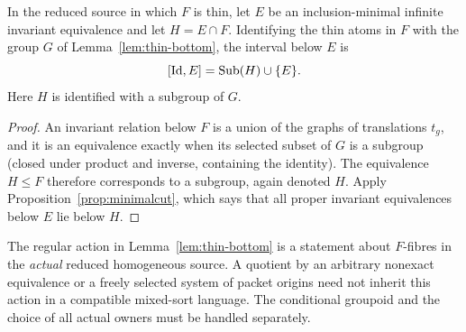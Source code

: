 \begin{corollary}
\label{cor:lower-subgroups}
In the reduced source in which $F$ is thin, let $E$ be an
inclusion-minimal infinite invariant equivalence and let
$H=E\cap F$.  Identifying the thin atoms in $F$ with the group
$G$ of Lemma~\ref{lem:thin-bottom}, the interval below $E$ is
\[
 [\mathrm{Id},E]=\operatorname{Sub}(H)\cup\{E\}.
\]
Here $H$ is identified with a subgroup of $G$.
\end{corollary}
\begin{proof}
An invariant relation below $F$ is a union of the graphs of
translations $t_g$, and it is an equivalence exactly when its
selected subset of $G$ is a subgroup (closed under product and
inverse, containing the identity).  The equivalence $H\le F$
therefore corresponds to a subgroup, again denoted $H$.
Apply Proposition~\ref{prop:minimalcut}, which says that all proper
invariant equivalences below $E$ lie below $H$.
\end{proof}

\begin{remark}
\label{rem:finite-bottom-scope}
The regular action in Lemma~\ref{lem:thin-bottom} is a statement
about $F$-fibres in the \emph{actual} reduced homogeneous source.
A quotient by an arbitrary nonexact equivalence or a freely
selected system of packet origins need not inherit this action
in a compatible mixed-sort language.  The conditional groupoid
and the choice of all actual owners must be handled separately.
\end{remark}
